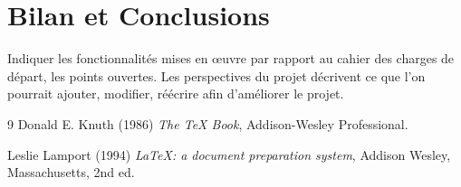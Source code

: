 \documentclass[a4paper]{article}
\begin{document}
\section{Bilan et Conclusions}

	Indiquer les fonctionnalités mises en œuvre par rapport au cahier des charges de départ, les points ouvertes.
	Les perspectives du projet décrivent ce que l’on pourrait ajouter, modifier, réécrire afin d’améliorer le projet. 
	
\begin{thebibliography}{9}
Donald E. Knuth (1986) \emph{The \TeX{} Book}, Addison-Wesley Professional.

Leslie Lamport (1994) \emph{\LaTeX: a document preparation system}, Addison
Wesley, Massachusetts, 2nd ed.
\end{thebibliography}
\end{document}
